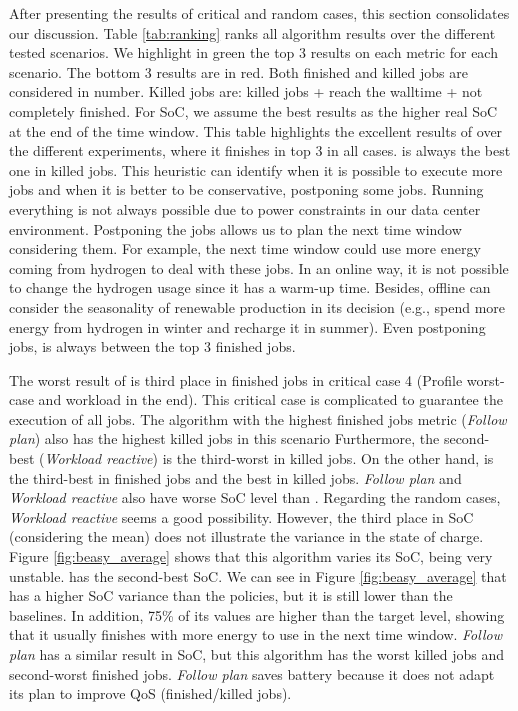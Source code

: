 After presenting the results of critical and random cases, this section consolidates our discussion. Table \ref{tab:ranking} ranks all algorithm results over the different tested scenarios. We highlight in green the top 3 results on each metric for each scenario. The bottom 3 results are in red. Both finished and killed jobs are considered in number. Killed jobs are: killed jobs + reach the walltime + not completely finished. For SoC, we assume the best results as the higher real SoC at the end of the time window. This table highlights the excellent results of \emph{\systemName} over the different experiments, where it finishes in top 3 in all cases. \emph{\systemName} is always the best one in killed jobs. This heuristic can identify when it is possible to execute more jobs and when it is better to be conservative, postponing some jobs. Running everything is not always possible due to power constraints in our data center environment. Postponing the jobs allows us to plan the next time window considering them. For example, the next time window could use more energy coming from hydrogen to deal with these jobs. In an online way, it is not possible to change the hydrogen usage since it has a warm-up time. Besides, offline can consider the seasonality of renewable production in its decision (e.g., spend more energy from hydrogen in winter and recharge it in summer). Even postponing jobs, \emph{\systemName} is always between the top 3 finished jobs. 

The worst result of \emph{\systemName} is third place in finished jobs in critical case 4 (Profile worst-case and workload in the end). This critical case is complicated to guarantee the execution of all jobs. The algorithm with the highest finished jobs metric (\emph{Follow plan}) also has the highest killed jobs in this scenario Furthermore, the second-best (\emph{Workload reactive}) is the third-worst in killed jobs. On the other hand, \emph{\systemName} is the third-best in finished jobs and the best in killed jobs. \emph{Follow plan} and \emph{Workload reactive} also have worse SoC level than \emph{\systemName}. Regarding the random cases, \emph{Workload reactive} seems a good possibility. However, the third place in SoC (considering the mean) does not illustrate the variance in the state of charge. Figure \ref{fig:beasy_average} shows that this algorithm varies its SoC, being very unstable. \emph{\systemName} has the second-best SoC. We can see in Figure \ref{fig:beasy_average} that \emph{\systemName} has a higher SoC variance than the policies, but it is still lower than the baselines. In addition, 75\% of its values are higher than the target level, showing that it usually finishes with more energy to use in the next time window. \emph{Follow plan} has a similar result in SoC, but this algorithm has the worst killed jobs and second-worst finished jobs. \emph{Follow plan} saves battery because it does not adapt its plan to improve QoS (finished/killed jobs). 

